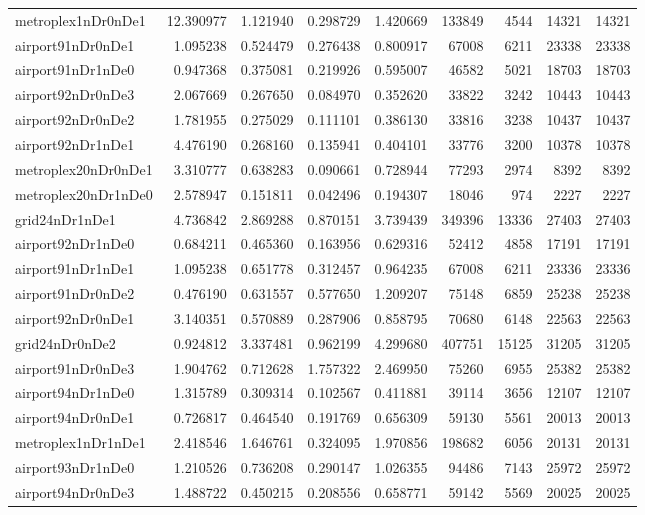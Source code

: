\documentclass[../../../thesis.tex]{subfiles}
\begin{document}
\begin{longtable}{|l|r|r|r|r|r|r|r|r|}
metroplex1nDr0nDe1 & 12.390977 & 1.121940 & 0.298729 & 1.420669 & 133849 & 4544 & 14321 & 14321 \\
airport91nDr0nDe1 & 1.095238 & 0.524479 & 0.276438 & 0.800917 & 67008 & 6211 & 23338 & 23338 \\
airport91nDr1nDe0 & 0.947368 & 0.375081 & 0.219926 & 0.595007 & 46582 & 5021 & 18703 & 18703 \\
airport92nDr0nDe3 & 2.067669 & 0.267650 & 0.084970 & 0.352620 & 33822 & 3242 & 10443 & 10443 \\
airport92nDr0nDe2 & 1.781955 & 0.275029 & 0.111101 & 0.386130 & 33816 & 3238 & 10437 & 10437 \\
airport92nDr1nDe1 & 4.476190 & 0.268160 & 0.135941 & 0.404101 & 33776 & 3200 & 10378 & 10378 \\
metroplex20nDr0nDe1 & 3.310777 & 0.638283 & 0.090661 & 0.728944 & 77293 & 2974 & 8392 & 8392 \\
metroplex20nDr1nDe0 & 2.578947 & 0.151811 & 0.042496 & 0.194307 & 18046 & 974 & 2227 & 2227 \\
grid24nDr1nDe1 & 4.736842 & 2.869288 & 0.870151 & 3.739439 & 349396 & 13336 & 27403 & 27403 \\
airport92nDr1nDe0 & 0.684211 & 0.465360 & 0.163956 & 0.629316 & 52412 & 4858 & 17191 & 17191 \\
airport91nDr1nDe1 & 1.095238 & 0.651778 & 0.312457 & 0.964235 & 67008 & 6211 & 23336 & 23336 \\
airport91nDr0nDe2 & 0.476190 & 0.631557 & 0.577650 & 1.209207 & 75148 & 6859 & 25238 & 25238 \\
airport92nDr0nDe1 & 3.140351 & 0.570889 & 0.287906 & 0.858795 & 70680 & 6148 & 22563 & 22563 \\
grid24nDr0nDe2 & 0.924812 & 3.337481 & 0.962199 & 4.299680 & 407751 & 15125 & 31205 & 31205 \\
airport91nDr0nDe3 & 1.904762 & 0.712628 & 1.757322 & 2.469950 & 75260 & 6955 & 25382 & 25382 \\
airport94nDr1nDe0 & 1.315789 & 0.309314 & 0.102567 & 0.411881 & 39114 & 3656 & 12107 & 12107 \\
airport94nDr0nDe1 & 0.726817 & 0.464540 & 0.191769 & 0.656309 & 59130 & 5561 & 20013 & 20013 \\
metroplex1nDr1nDe1 & 2.418546 & 1.646761 & 0.324095 & 1.970856 & 198682 & 6056 & 20131 & 20131 \\
airport93nDr1nDe0 & 1.210526 & 0.736208 & 0.290147 & 1.026355 & 94486 & 7143 & 25972 & 25972 \\
airport94nDr0nDe3 & 1.488722 & 0.450215 & 0.208556 & 0.658771 & 59142 & 5569 & 20025 & 20025 \\

\end{longtable}
\end{document}
